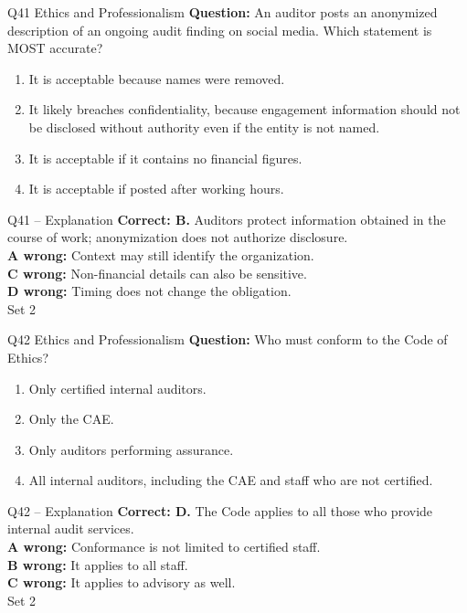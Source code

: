 \documentclass[aspectratio=169,10pt]{beamer}
\begin{document}
\begin{frame}[t]{Q41 \hfill {\scriptsize Ethics and Professionalism}}
	\small
	\textbf{Question:} An auditor posts an anonymized description of an ongoing audit finding on social media. Which statement is MOST accurate?
	\begin{enumerate}[label=\Alph*.,itemsep=1pt,topsep=3pt]
			\item It is acceptable because names were removed.
			\item It likely breaches confidentiality, because engagement information should not be disclosed without authority even if the entity is not named.
			\item It is acceptable if it contains no financial figures.
			\item It is acceptable if posted after working hours.
	\end{enumerate}
\end{frame}

\begin{frame}[t]{Q41 -- Explanation}
	\footnotesize
	\textbf{Correct: B.} Auditors protect information obtained in the course of work; anonymization does not authorize disclosure. \\[5pt]
\textbf{A wrong:} Context may still identify the organization. \\[3pt]
\textbf{C wrong:} Non-financial details can also be sensitive. \\[3pt]
\textbf{D wrong:} Timing does not change the obligation. \\[3pt]
	\vfill {\tiny Set 2}
\end{frame}

\begin{frame}[t]{Q42 \hfill {\scriptsize Ethics and Professionalism}}
	\small
	\textbf{Question:} Who must conform to the Code of Ethics?
	\begin{enumerate}[label=\Alph*.,itemsep=1pt,topsep=3pt]
			\item Only certified internal auditors.
			\item Only the CAE.
			\item Only auditors performing assurance.
			\item All internal auditors, including the CAE and staff who are not certified.
	\end{enumerate}
\end{frame}

\begin{frame}[t]{Q42 -- Explanation}
	\footnotesize
	\textbf{Correct: D.} The Code applies to all those who provide internal audit services. \\[5pt]
\textbf{A wrong:} Conformance is not limited to certified staff. \\[3pt]
\textbf{B wrong:} It applies to all staff. \\[3pt]
\textbf{C wrong:} It applies to advisory as well. \\[3pt]
	\vfill {\tiny Set 2}
\end{frame}
\end{document}
